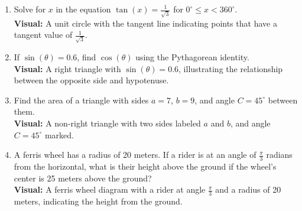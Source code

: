 \begin{enumerate}
    \item Solve for $x$ in the equation $\tan(x) = \frac{1}{\sqrt{3}}$ for $0^\circ \leq x < 360^\circ$.
    \\ 
    \textbf{Visual:} A unit circle with the tangent line indicating points that have a tangent value of $\frac{1}{\sqrt{3}}$.

    \item If $\sin(\theta) = 0.6$, find $\cos(\theta)$ using the Pythagorean identity.
    \\ 
    \textbf{Visual:} A right triangle with $\sin(\theta) = 0.6$, illustrating the relationship between the opposite side and hypotenuse.

    \item Find the area of a triangle with sides $a = 7$, $b = 9$, and angle $C = 45^\circ$ between them.
    \\ 
    \textbf{Visual:} A non-right triangle with two sides labeled $a$ and $b$, and angle $C = 45^\circ$ marked.

    \item A ferris wheel has a radius of 20 meters. If a rider is at an angle of $\frac{\pi}{3}$ radians from the horizontal, what is their height above the ground if the wheel's center is 25 meters above the ground?
    \\ 
    \textbf{Visual:} A ferris wheel diagram with a rider at angle $\frac{\pi}{3}$ and a radius of 20 meters, indicating the height from the ground.

\end{enumerate}
